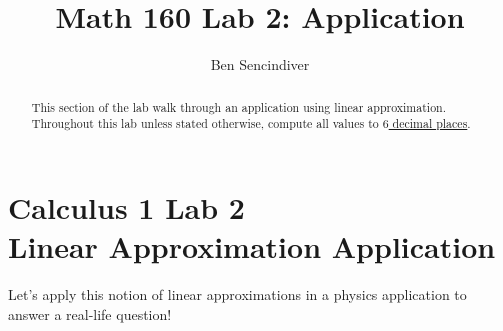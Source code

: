 \documentclass[handout,nooutcomes]{ximera}
\title{Math 160 Lab 2: Application}
\author{Ben Sencindiver} %
\begin{document}
\section{Calculus 1 Lab 2 \\ Linear Approximation Application}

\begin{abstract}
This section of the lab walk through an application using linear approximation.\\

Throughout this lab unless stated otherwise, compute all values to \underline{$6$ decimal places}.
\end{abstract}

\maketitle



Let's apply this notion of linear approximations in a physics application to
answer a real-life question!\\
\end{document}
